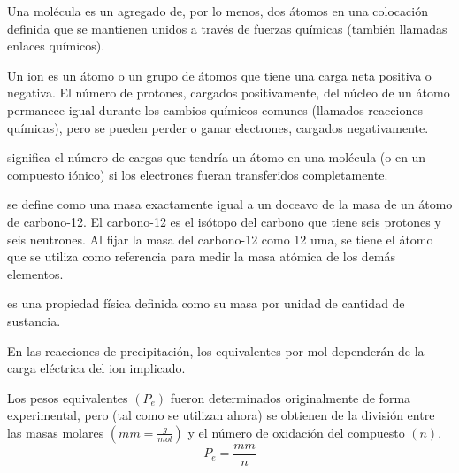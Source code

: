\begin{definition}[Molécula]
	Una molécula es un agregado de, por lo menos, dos átomos en una colocación definida
	que se mantienen unidos a través de fuerzas químicas (también llamadas enlaces químicos).
\end{definition}

\begin{definition}[Ión]
	Un ion es un átomo o un grupo de átomos que tiene una carga neta positiva o negativa.
	El número de protones, cargados positivamente, del núcleo de un átomo permanece igual
	durante los cambios químicos comunes (llamados reacciones químicas), pero se pueden
	perder o ganar electrones, cargados negativamente.
\end{definition}

\begin{definition}
	significa el número de cargas que tendría
	un átomo en una molécula (o en un compuesto iónico)
	si los electrones fueran transferidos completamente.
\end{definition}

\begin{definition}
	se define como una masa exactamente igual a un doceavo de la masa de un
	átomo de carbono-12. El carbono-12 es el isótopo del carbono que tiene seis protones y
	seis neutrones. Al fijar la masa del carbono-12 como 12 uma, se tiene el átomo que se
	utiliza como referencia para medir la masa atómica de los demás elementos.
\end{definition}

\begin{definition}
	es una propiedad física definida como su masa por unidad de cantidad de sustancia.
\end{definition}

\begin{definition}
	En las reacciones de precipitación, los equivalentes por mol dependerán de la
	carga eléctrica del ion implicado.
\end{definition}

\begin{definition}
	Los pesos equivalentes $(P_{e})$ fueron determinados
	originalmente de forma experimental, pero
	(tal como se utilizan ahora) se obtienen de la
	división entre las masas molares $(mm=\frac{g}{mol})$
	y el número de oxidación del compuesto $(n)$.
	\begin{equation}
		P_{e}=\frac{mm}{n}
	\end{equation}
\end{definition}

